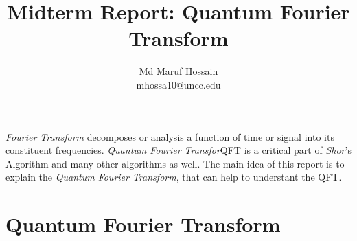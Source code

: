 \documentclass[a4paper,10pt]{article}
\title{Midterm Report: Quantum Fourier Transform}
\author[]{Md Maruf Hossain \\ mhossa10@uncc.edu}
\affil[]{Department of Computer Science, UNC Charlotte}
\date{}
\begin{document}
\maketitle
\textit{Fourier Transform} decomposes or analysis a function of time or signal into its constituent frequencies. 
\textit{Quantum Fourier Transfor}{QFT} is a critical part of \textit{Shor}'s Algorithm and many other algorithms as well.
The main idea of this report is to explain the \textit{Quantum Fourier Transform}, that can help to understant the QFT.

\section{Quantum Fourier Transform}
 



\end{document}

